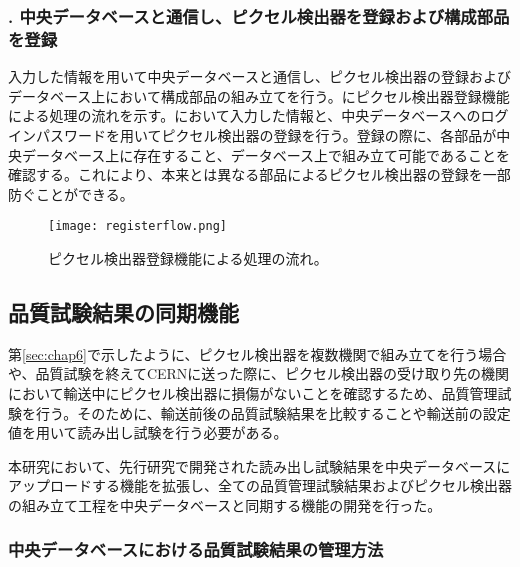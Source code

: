\subsubsection{. 中央データベースと通信し、ピクセル検出器を登録および構成部品を登録}

入力した情報を用いて中央データベースと通信し、ピクセル検出器の登録およびデータベース上において構成部品の組み立てを行う。にピクセル検出器登録機能による処理の流れを示す。において入力した情報と、中央データベースへのログインパスワードを用いてピクセル検出器の登録を行う。登録の際に、各部品が中央データベース上に存在すること、データベース上で組み立て可能であることを確認する。これにより、本来とは異なる部品によるピクセル検出器の登録を一部防ぐことができる。

\begin{figure}[tbp]
  \centering
  \texttt{[image: registerflow.png]}
  \caption[ピクセル検出器登録機能による処理の流れ]{ピクセル検出器登録機能による処理の流れ。}
  \label{fig:dbregistermodule}
\end{figure}


\subsection{品質試験結果の同期機能}
\label{sec:upload-result}

第\ref{sec:chap6}で示したように、ピクセル検出器を複数機関で組み立てを行う場合や、品質試験を終えてCERNに送った際に、ピクセル検出器の受け取り先の機関において輸送中にピクセル検出器に損傷がないことを確認するため、品質管理試験を行う。そのために、輸送前後の品質試験結果を比較することや輸送前の設定値を用いて読み出し試験を行う必要がある。

本研究において、先行研究\cite{oku}で開発された読み出し試験結果を中央データベースにアップロードする機能を拡張し、全ての品質管理試験結果およびピクセル検出器の組み立て工程を中央データベースと同期する機能の開発を行った。


\subsubsection{中央データベースにおける品質試験結果の管理方法}

